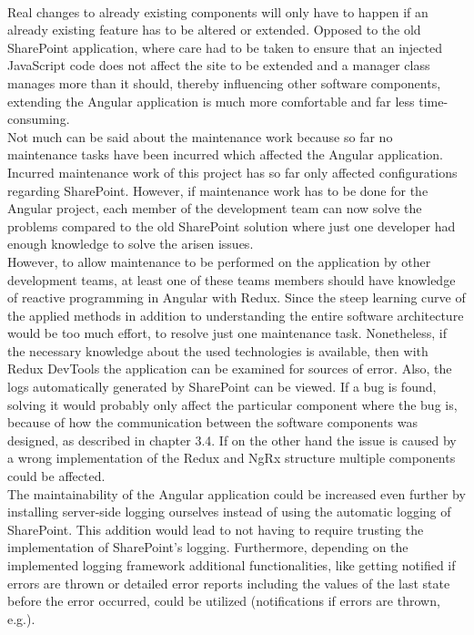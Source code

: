 \documentclass[Bachelor,BIF,english]{twbook}
\begin{document}
\\[\baselineskip]
Real changes to already existing components will only have to happen if an already existing feature has to be altered or extended. Opposed to the old SharePoint application, where care had to be taken to ensure that an injected JavaScript code does not affect the site to be extended and a manager class manages more than it should, thereby influencing other software components, extending the Angular application is much more comfortable and far less time-consuming.
\\[\baselineskip]
Not much can be said about the maintenance work because so far no maintenance tasks have been incurred which affected the Angular application. Incurred maintenance work of this project has so far only affected configurations regarding SharePoint. However, if maintenance work has to be done for the Angular project, each member of the development team can now solve the problems compared to the old SharePoint solution where just one developer had enough knowledge to solve the arisen issues.
\\[\baselineskip]
However, to allow maintenance to be performed on the application by other development teams, at least one of these teams members should have knowledge of reactive programming in Angular with Redux. Since the steep learning curve of the applied methods in addition to understanding the entire software architecture would be too much effort, to resolve just one maintenance task. Nonetheless, if the necessary knowledge about the used technologies is available, then with Redux DevTools the application can be examined for sources of error. Also, the logs automatically generated by SharePoint can be viewed. If a bug is found, solving it would probably only affect the particular component where the bug is, because of how the communication between the software components was designed, as described in chapter 3.4. If on the other hand the issue is caused by a wrong implementation of the Redux and NgRx structure multiple components could be affected.
\\[\baselineskip]
The maintainability of the Angular application could be increased even further by installing server-side logging ourselves instead of using the automatic logging of SharePoint. This addition would lead to not having to require trusting the implementation of SharePoint's logging. Furthermore, depending on the implemented logging framework additional functionalities, like getting notified if errors are thrown or detailed error reports including the values of the last state before the error occurred, could be utilized (notifications if errors are thrown, e.g.).
\clearpage
\end{document}
